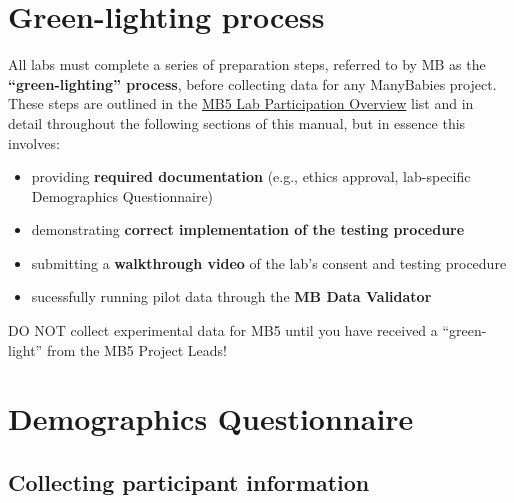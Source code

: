 \documentclass[
  letterpaper,
  DIV=11,
  numbers=noendperiod,
  oneside]{scrreprt}
\providecommand{\tightlist}{%
  \setlength{\itemsep}{0pt}\setlength{\parskip}{0pt}}
\begin{document}
\chapter{Green-lighting process}\label{sec-greenlight}

All labs must complete a series of preparation steps, referred to by MB
as the \textbf{``green-lighting'' process}, before collecting data for
any ManyBabies project. These steps are outlined in the
\hyperref[sec-laboverview]{MB5 Lab Participation Overview} list and in
detail throughout the following sections of this manual, but in essence
this involves:

\begin{itemize}
\tightlist
\item
  providing \textbf{required documentation} (e.g., ethics approval,
  lab-specific Demographics Questionnaire)
\item
  demonstrating \textbf{correct implementation of the testing procedure}
\item
  submitting a \textbf{walkthrough video} of the lab's consent and
  testing procedure
\item
  sucessfully running pilot data through the \textbf{MB Data Validator}
\end{itemize}

\begin{tcolorbox}[enhanced jigsaw, colbacktitle=quarto-callout-important-color!10!white, coltitle=black, colframe=quarto-callout-important-color-frame, arc=.35mm, colback=white, left=2mm, opacityback=0, opacitybacktitle=0.6, breakable, bottomtitle=1mm, titlerule=0mm, rightrule=.15mm, leftrule=.75mm, toptitle=1mm, title=\textcolor{quarto-callout-important-color}{\faExclamation}\hspace{0.5em}{IMPORTANT:}, bottomrule=.15mm, toprule=.15mm]

DO NOT collect experimental data for MB5 until you have received a
``green-light'' from the MB5 Project Leads!

\end{tcolorbox}

\chapter{Demographics Questionnaire}\label{sec-demographics}

\section{Collecting participant
information}\label{collecting-participant-information}
\end{document}
